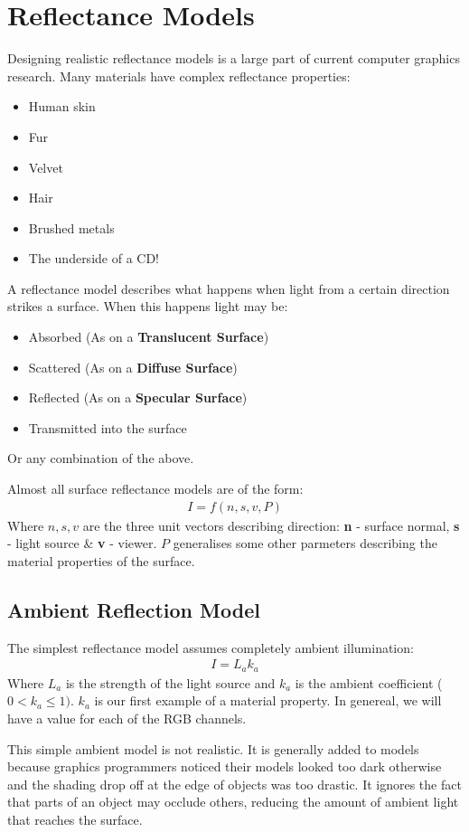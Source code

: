 \documentclass{article}
\begin{document}
\section{Reflectance Models}
Designing realistic reflectance models is a large part of current computer graphics research.
Many materials have complex reflectance properties:
\begin{itemize}
	\item Human skin
	\item Fur
	\item Velvet
	\item Hair
	\item Brushed metals
	\item The underside of a CD!
\end{itemize}
A reflectance model describes what happens when light from a certain direction strikes a surface.
When this happens light may be:
\begin{itemize}
	\item Absorbed (As on a \textbf{Translucent Surface})
	\item Scattered (As on a \textbf{Diffuse Surface})
	\item Reflected (As on a \textbf{Specular Surface})
	\item Transmitted into the surface
\end{itemize}
Or any combination of the above.

Almost all surface reflectance models are of the form:
\begin{align*}
	I = f(n,s,v,P)
\end{align*}
Where $n,s,v$ are the three unit vectors describing direction: \textbf{n} - surface normal, \textbf{s} - light source \& \textbf{v} - viewer.
$P$ generalises some other parmeters describing the material properties of the surface.

\subsection{Ambient Reflection Model}
The simplest reflectance model assumes completely ambient illumination:
\begin{align*}
I = L_ak_a
\end{align*}
Where $L_a$ is the strength of the light source and $k_a$ is the ambient coefficient ($0<k_a\leq1).$
$k_a$ is our first example of a material property.
In genereal, we will have a value for each of the RGB channels.

This simple ambient model is not realistic.
It is generally added to models because graphics programmers noticed their models looked too dark otherwise and the shading drop off at the edge of objects was too drastic.
It ignores the fact that parts of an object may occlude others, reducing the amount of ambient light that reaches the surface.
\end{document}
